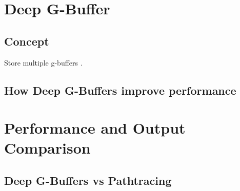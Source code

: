 \documentclass{ACGSeminar}
\begin{document}
\section{Deep G-Buffer}
	\subsection{Concept}
	Store multiple g-buffers \cite{NDGB}.
	\subsection{How Deep G-Buffers improve performance}

\section{Performance and Output Comparison}
	\subsection{Deep G-Buffers vs Pathtracing}

%

\label{cha:references}
\printbibliography
\end{document}
